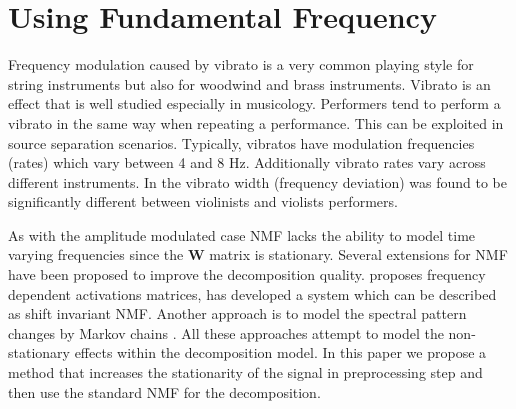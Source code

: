 \section{Using Fundamental Frequency}
\label{sub:frequency_modulation}


Frequency modulation caused by vibrato is a very common playing style for string instruments but also for woodwind and brass instruments.
Vibrato is an effect that is well studied especially in musicology.
Performers tend to perform a vibrato in the same way when repeating a performance.
This can be exploited in source separation scenarios.
Typically, vibratos have modulation frequencies (rates) which vary between 4 and 8 Hz.
Additionally vibrato rates vary across different instruments.
In \cite{macleod06} the vibrato width (frequency deviation) was found to be significantly different between violinists and violists performers.

As with the amplitude modulated case NMF lacks the ability to model time varying frequencies since the $\mathbf{W}$ matrix is stationary.
Several extensions for NMF have been proposed to improve the decomposition quality.
\cite{hennequin11} proposes frequency dependent activations matrices, \cite{smaragdis08} has developed a system which can be described as shift invariant NMF.
Another approach is to model the spectral pattern changes by Markov chains \cite{nakano10}. All these approaches attempt to model the non-stationary effects within the decomposition model.
In this paper we propose a method that increases the stationarity of the signal in preprocessing step and then use the standard NMF for the decomposition. \\



